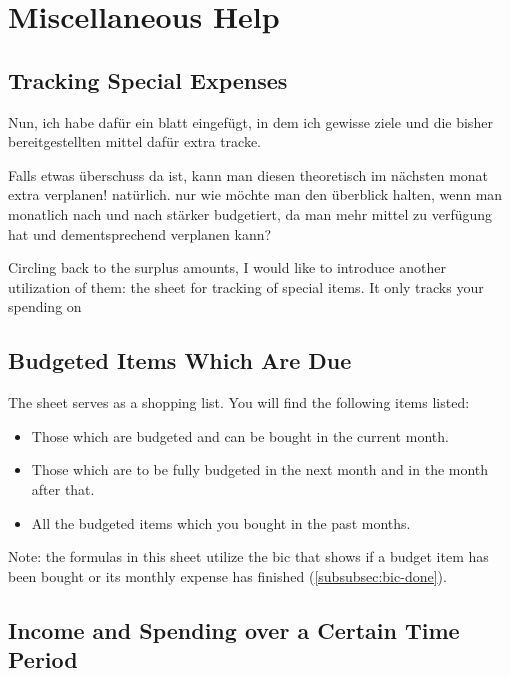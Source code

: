 \section{Miscellaneous Help}
\label{sec:miscellaneous-help}

\subsection{Tracking Special Expenses}
\label{subsec:tracking-special-expenses}

Nun, ich habe dafür ein blatt eingefügt, in dem ich gewisse ziele und die bisher bereitgestellten mittel dafür extra tracke.

Falls etwas überschuss da ist, kann man diesen theoretisch im nächsten monat extra verplanen! natürlich. nur wie möchte man den überblick halten, wenn man monatlich nach und nach stärker budgetiert, da man mehr mittel zu verfügung hat und dementsprechend verplanen kann?

Circling back to the surplus amounts, I would like to introduce another utilization of them: the sheet for tracking of special items.
It only tracks your spending on 



\subsection{Budgeted Items Which Are Due}
\label{subsec:budgeted-items-which-are-due}

The sheet  serves as a shopping list.
You will find the following items listed:
\begin{itemize}
	\item Those which are budgeted and can be bought in the current month.
	\item Those which are to be fully budgeted in the next month and in the month after that.
	\item All the budgeted items which you bought in the past months.
\end{itemize}

Note: the formulas in this sheet utilize the \ac{bic} that shows if a budget item has been bought or its monthly expense has finished (\autoref{subsubsec:bic-done}).

\subsection{Income and Spending over a Certain Time Period}
\label{subsec:income-and-spending-certain-time-period}

